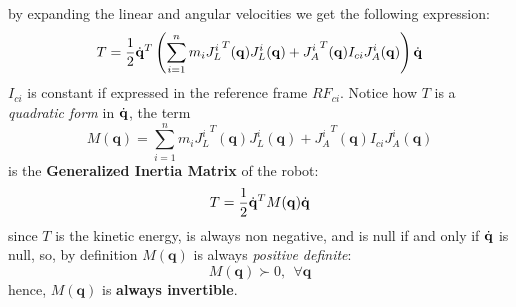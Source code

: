 \documentclass[10pt, a4paper]{report}
\newcommand{\q}{{\mathbf q}}
\begin{document}
by expanding the linear and angular velocities we get the following expression:\begin{equation}
    T=\frac{1}{2}\dq^T\left(
       \sum_{i=1}^n m_i{J_L^i}^T(\q){J_L^i}(\q)+{J_A^i}^T(\q)I_{ci}J_A^i(\q)
    \right)\dq
\end{equation}
$I_{ci}$ is constant if expressed in the reference frame $RF_{ci}$. Notice how $T$ is a \textit{quadratic form} in ${\dot{\mathbf q}}$, the term \begin{equation}
    M(\q)=\sum_{i=1}^n m_i{J_L^i}^T(\q){J_L^i}(\q)+{J_A^i}^T(\q)I_{ci}J_A^i(\q)
\end{equation}
is the \textbf{Generalized Inertia Matrix} of the robot:\begin{equation}
    T=\frac{1}{2}\dq^TM(\q)\dq 
\end{equation}
since $T$ is the kinetic energy, is always non negative, and is null if and only if ${\dot{\mathbf q}}$ is null, so, by definition $M(\q)$ is always \textit{positive definite}:\begin{equation}
    M(\q)\succ 0, \ \ \forall \q
\end{equation}
hence, $M(\q)$ is \textbf{always invertible}.\bigskip 
\end{document}
